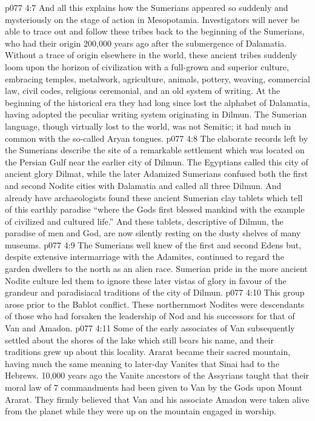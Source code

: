 \vs p077 4:7 And all this explains how the Sumerians appeared so suddenly and mysteriously on the stage of action in Mesopotamia. Investigators will never be able to trace out and follow these tribes back to the beginning of the Sumerians, who had their origin 200,000 years ago after the submergence of Dalamatia. Without a trace of origin elsewhere in the world, these ancient tribes suddenly loom upon the horizon of civilization with a full\hyp{}grown and superior culture, embracing temples, metalwork, agriculture, animals, pottery, weaving, commercial law, civil codes, religious ceremonial, and an old system of writing. At the beginning of the historical era they had long since lost the alphabet of Dalamatia, having adopted the peculiar writing system originating in Dilmun. The Sumerian language, though virtually lost to the world, was not Semitic; it had much in common with the so\hyp{}called Aryan tongues.
\vs p077 4:8 The elaborate records left by the Sumerians describe the site of a remarkable settlement which was located on the Persian Gulf near the earlier city of Dilmun. The Egyptians called this city of ancient glory Dilmat, while the later Adamized Sumerians confused both the first and second Nodite cities with Dalamatia and called all three Dilmun. And already have archaeologists found these ancient Sumerian clay tablets which tell of this earthly paradise “where the Gods first blessed mankind with the example of civilized and cultured life.” And these tablets, descriptive of Dilmun, the paradise of men and God, are now silently resting on the dusty shelves of many museums.
\vs p077 4:9 The Sumerians well knew of the first and second Edens but, despite extensive intermarriage with the Adamites, continued to regard the garden dwellers to the north as an alien race. Sumerian pride in the more ancient Nodite culture led them to ignore these later vistas of glory in favour of the grandeur and paradisiacal traditions of the city of Dilmun.
\vs p077 4:10 \bibnobreakspace {} This group arose prior to the Bablot conflict. These northernmost Nodites were descendants of those who had forsaken the leadership of Nod and his successors for that of Van and Amadon.
\vs p077 4:11 \pc Some of the early associates of Van subsequently settled about the shores of the lake which still bears his name, and their traditions grew up about this locality. Ararat became their sacred mountain, having much the same meaning to later\hyp{}day Vanites that Sinai had to the Hebrews. 10,000 years ago the Vanite ancestors of the Assyrians taught that their moral law of 7 commandments had been given to Van by the Gods upon Mount Ararat. They firmly believed that Van and his associate Amadon were taken alive from the planet while they were up on the mountain engaged in worship.
